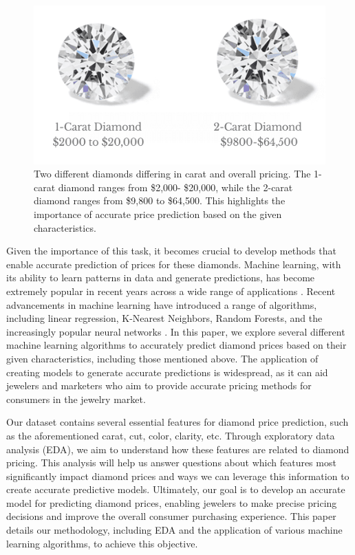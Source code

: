 \documentclass[conference]{IEEEtran}
\begin{document}
\begin{figure}[H]
    \centering
    \includegraphics[width=0.8\linewidth]{diamond_intro.png} %
    \caption{Two different diamonds differing in carat and overall pricing. The 1-carat diamond ranges from \$2,000- \$20,000, while the 2-carat diamond ranges from \$9,800 to \$64,500. This highlights the importance of accurate price prediction based on the given characteristics.}
    \label{fig:diamond_intro}
\end{figure}

Given the importance of this task, it becomes crucial to develop methods that enable accurate prediction of prices for these diamonds. Machine learning, with its ability to learn patterns in data and generate predictions, has become extremely popular in recent years across a wide range of applications \cite{kino}. Recent advancements in machine learning have introduced a range of algorithms, including linear regression, K-Nearest Neighbors, Random Forests, and the increasingly popular neural networks \cite{sarker}. In this paper, we explore several different machine learning algorithms to accurately predict diamond prices based on their given characteristics, including those mentioned above. The application of creating models to generate accurate predictions is widespread, as it can aid jewelers and marketers who aim to provide accurate pricing methods for consumers in the jewelry market.

Our dataset contains several essential features for diamond price prediction, such as the aforementioned carat, cut, color, clarity, etc. \cite{kaggle} Through exploratory data analysis (EDA), we aim to understand how these features are related to diamond pricing. This analysis will help us answer questions about which features most significantly impact diamond prices and ways we can leverage this information to create accurate predictive models. Ultimately, our goal is to develop an accurate model for predicting diamond prices, enabling jewelers to make precise pricing decisions and improve the overall consumer purchasing experience. This paper details our methodology, including EDA and the application of various machine learning algorithms, to achieve this objective.
\end{document}
